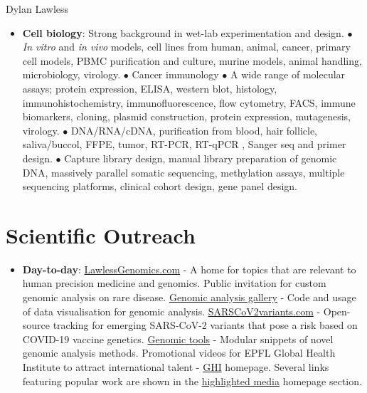 \documentclass[11pt,a4paper]{article}
\begin{document}
\begin{cv}{Dylan Lawless}
\begin{itemize}[leftmargin=*]
\item \textbf{Cell biology}: Strong background in wet-lab experimentation and design.
$\bullet$ \textit{In vitro} and \textit{in vivo} models,
cell lines from human, animal, cancer, primary cell models, PBMC purification and culture, murine models, animal handling, microbiology, virology.
$\bullet$ Cancer immunology
$\bullet$ A wide range of molecular assays; protein expression, ELISA, western blot, histology, immunohistochemistry, immunofluorescence, flow cytometry, FACS, immune biomarkers, 
cloning, plasmid construction, protein expression, mutagenesis, virology.
$\bullet$ DNA/RNA/cDNA, purification from blood, hair follicle, saliva/buccol, FFPE, tumor, RT-PCR, RT-qPCR , Sanger seq and primer design.
$\bullet$ Capture library design, manual library preparation of genomic DNA, 
massively parallel somatic sequencing, methylation assays, multiple sequencing platforms, 
clinical cohort design, gene panel design.
\end{itemize}

\section*{Scientific Outreach}

\begin{itemize}[leftmargin=*]
\item
\textbf{Day-to-day}: 
\href{https://lawlessgenomics.com}{LawlessGenomics.com} - A home for topics that are relevant to human precision medicine and genomics. Public invitation for custom genomic analysis on rare disease.
\href{https://lawlessgenomics.com/portfolio}{Genomic analysis gallery} - Code and usage of data visualisation for genomic analysis.
\href{https://sarscov2variants.com}{SARSCoV2variants.com} - Open-source tracking for emerging SARS-CoV-2 variants that pose a risk based on COVID-19 vaccine genetics.
\href{https://github.com/DylanLawless/genomics_tools}{Genomic tools} - Modular snippets of novel genomic analysis methods.
Promotional videos for EPFL Global Health Institute to attract international talent - \href{https://www.epfl.ch/schools/sv/ghi/}{GHI} homepage.
Several links featuring popular work are shown in the \href{https://lawlessgenomics.com}{highlighted media} homepage section.


\end{itemize}
\end{cv}
\end{document}
